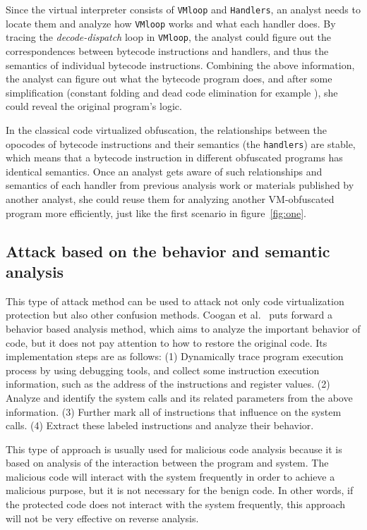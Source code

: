 Since the virtual interpreter consists of \texttt{VMloop} and \texttt{Handlers}, an analyst needs to locate them and analyze how \texttt{VMloop} works and what each handler does. By tracing the \textit{decode-dispatch} loop in \texttt{VMloop}, the analyst could figure out the correspondences between bytecode instructions and handlers, and thus the semantics of individual bytecode instructions. Combining the above information, the analyst can figure out what the bytecode program does, and after some simplification (constant folding and dead code elimination for example \cite{fightingoreans}), she could reveal the original program's logic.

In the classical code virtualized obfuscation, the relationships between the opocodes of bytecode instructions and their semantics (the \texttt{handlers}) are stable, which means that a bytecode instruction in different obfuscated programs has identical semantics. Once an analyst gets aware of such relationships and semantics of each handler from previous analysis work or materials published by another analyst, she could reuse them for analyzing another VM-obfuscated program more efficiently, just like the first scenario in figure~\ref{fig:one}.


\subsection{Attack based on the behavior and semantic analysis}
This type of attack method can be used to attack not only code virtualization protection but also other confusion methods.
Coogan et al.~\cite{coogan2011deobfuscation} puts forward a behavior based analysis method, which aims to analyze the important behavior of code, but it does not pay attention to how to restore the original code. Its implementation steps are as follows: (1) Dynamically trace program execution process by using debugging tools, and collect some instruction execution information, such as the address of the instructions and register values. (2) Analyze and identify the system calls and its related parameters from the above information. (3) Further mark all of instructions that influence on the system calls. (4) Extract these labeled instructions and analyze their behavior.

This type of approach is usually used for malicious code analysis because it is based on analysis of the interaction between the program and system. The malicious code will interact with the system frequently in order to achieve a malicious purpose, but it is not necessary for the benign code. In other words, if the protected code does not interact with the system frequently, this approach will not be very effective on reverse analysis.

